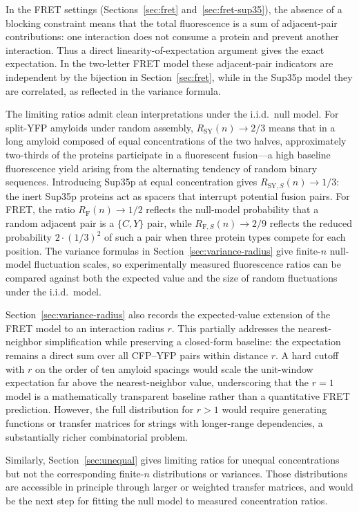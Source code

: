 \documentclass[referee,lineno,pdflatex,sn-mathphys-ay]{sn-jnl}
\begin{document}
In the FRET settings (Sections~\ref{sec:fret} and~\ref{sec:fret-sup35}), the absence of a blocking constraint means that the total fluorescence is a sum of adjacent-pair contributions: one interaction does not consume a protein and prevent another interaction. Thus a direct linearity-of-expectation argument gives the exact expectation. In the two-letter FRET model these adjacent-pair indicators are independent by the bijection in Section~\ref{sec:fret}, while in the Sup35p model they are correlated, as reflected in the variance formula.

The limiting ratios admit clean interpretations under the i.i.d.\ null model. For split-YFP amyloids under random assembly, $R_{\text{SY}}(n) \to 2/3$ means that in a long amyloid composed of equal concentrations of the two halves, approximately two-thirds of the proteins participate in a fluorescent fusion---a high baseline fluorescence yield arising from the alternating tendency of random binary sequences. Introducing Sup35p at equal concentration gives $R_{\text{SY},S}(n)\to 1/3$: the inert Sup35p proteins act as spacers that interrupt potential fusion pairs. For FRET, the ratio $R_{\text{F}}(n) \to 1/2$ reflects the null-model probability that a random adjacent pair is a $\{C,Y\}$ pair, while $R_{\text{F},S}(n)\to 2/9$ reflects the reduced probability $2 \cdot (1/3)^2$ of such a pair when three protein types compete for each position. The variance formulas in Section~\ref{sec:variance-radius} give finite-$n$ null-model fluctuation scales, so experimentally measured fluorescence ratios can be compared against both the expected value and the size of random fluctuations under the i.i.d.\ model.

Section~\ref{sec:variance-radius} also records the expected-value extension of the FRET model to an interaction radius $r$. This partially addresses the nearest-neighbor simplification while preserving a closed-form baseline: the expectation remains a direct sum over all CFP--YFP pairs within distance $r$. A hard cutoff with $r$ on the order of ten amyloid spacings would scale the unit-window expectation far above the nearest-neighbor value, underscoring that the $r=1$ model is a mathematically transparent baseline rather than a quantitative FRET prediction. However, the full distribution for $r>1$ would require generating functions or transfer matrices for strings with longer-range dependencies, a substantially richer combinatorial problem.

Similarly, Section~\ref{sec:unequal} gives limiting ratios for unequal concentrations but not the corresponding finite-$n$ distributions or variances. Those distributions are accessible in principle through larger or weighted transfer matrices, and would be the next step for fitting the null model to measured concentration ratios.
\end{document}
